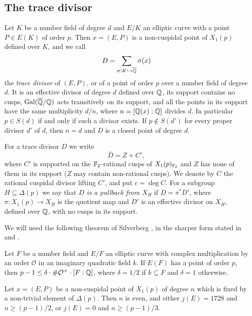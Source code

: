\subsection{The trace divisor}\label{sec:trace}
Let $K$ be a number field of degree $d$ and $E/K$ an elliptic curve with a point $P\in E(K)$ of order $p$. Then $x=(E,P)$ is a non-cuspidal point of $X_1(p)$ defined over $K$, and we call
$$D=\sum_{\sigma:K\hookrightarrow\overline{\mathbb{Q}}}\sigma(x)$$
the \textit{trace divisor} of $(E,P)$, or of a point of order $p$ over a number field of degree $d$. It is an effective divisor of degree $d$ defined over $\mathbb{Q}$, its support contains no cusps, $\operatorname{Gal}(\overline{\mathbb{Q}}/\mathbb{Q})$ acts transitively on its support, and all the points in its support have the same multiplicity $d/n$, where $n=[\mathbb{Q}(x):\mathbb{Q}]$ divides $d$. In particular $p\in S(d)$ if and only if such a divisor exists. If $p\notin S(d')$ for every proper divisor $d'$ of $d$, then $n=d$ and $D$ is a closed point of degree $d$.

For a trace divisor $D$ we write
$$\overline D=Z+C',$$
where $C'$ is supported on the $\mathbb{F}_2$-rational cusps of $X_1(p)_{\mathbb{F}_2}$ and $Z$ has none of them in its support ($Z$ may contain non-rational cusps). We denote by $C$ the rational cuspidal divisor lifting $C'$, and put $c=\deg C$. For a subgroup $H\subseteq\Delta(p)$ we say that \textit{$D$ is a pullback from $X_H$} if $D=\pi^*D'$, where $\pi:X_1(p)\to X_H$ is the quotient map and $D'$ is an effective divisor on $X_H$, defined over $\mathbb{Q}$, with no cusps in its support.

We will need the following theorem of Silverberg \cite{silverberg}, in the sharper form stated in \cite[Section 1]{PY} and \cite[Theorem 1.1]{BC}.

\begin{lemma}[Silverberg]\label{lem:silverberg}
Let $F$ be a number field and $E/F$ an elliptic curve with complex multiplication by an order $\mathcal O$ in an imaginary quadratic field $k$. If $E(F)$ has a point of order $p$, then $p-1\leq\delta\cdot\#\mathcal O^\times\cdot[F:\mathbb{Q}]$, where $\delta=1/2$ if $k\subseteq F$ and $\delta=1$ otherwise.
\end{lemma}

\begin{lemma}\label{lem:CM}
Let $x=(E,P)$ be a non-cuspidal point of $X_1(p)$ of degree $n$ which is fixed by a non-trivial element of $\Delta(p)$. Then $n$ is even, and either $j(E)=1728$ and $n\geq(p-1)/2$, or $j(E)=0$ and $n\geq(p-1)/3$.
\end{lemma}

